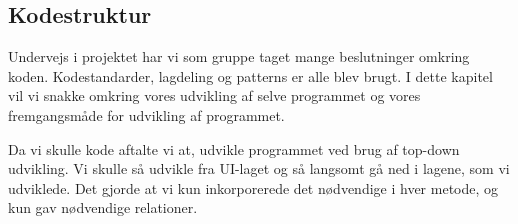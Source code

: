 \subsection{Kodestruktur}

Undervejs i projektet har vi som gruppe taget mange beslutninger omkring koden.
Kodestandarder, lagdeling og patterns er alle blev brugt.
I dette kapitel vil vi snakke omkring vores udvikling af selve programmet og vores fremgangsmåde for udvikling af programmet. 

Da vi skulle kode aftalte vi at, udvikle programmet ved brug af top-down udvikling. Vi skulle så udvikle fra UI-laget og så langsomt gå ned i lagene, som vi udviklede. Det gjorde at vi kun inkorporerede det nødvendige i hver metode, og kun gav nødvendige relationer.